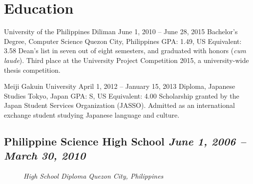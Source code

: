 \section*{Education}

\academe
  {University of the Philippines Diliman}
  {June 1, 2010 -- June 28, 2015}
  {Bachelor's Degree, Computer Science}
  {Quezon City, Philippines}
  {GPA: 1.49, US Equivalent: 3.58}
  {Dean's list in seven out of eight semesters, and graduated with honors (\emph{cum laude}).}
  {Third place at the University Project Competition 2015, a university-wide thesis competition.}

\academe
  {Meiji Gakuin University}
  {April 1, 2012 -- January 15, 2013}
  {Diploma, Japanese Studies}
  {Tokyo, Japan}
  {GPA: S, US Equivalent: 4.00}
  {Scholarship granted by the Japan Student Services Organization (JASSO).}
  {Admitted as an international exchange student studying Japanese language and culture.}

\subsection*{{\color{special-color}Philippine Science High School \hfill \textnormal{\emph{June 1, 2006 -- March 30, 2010}}}}
\begin{description}
  \item[\faGraduationCap]\emph{High School Diploma \hfill {\color{gray}Quezon City, Philippines}}
\end{description}